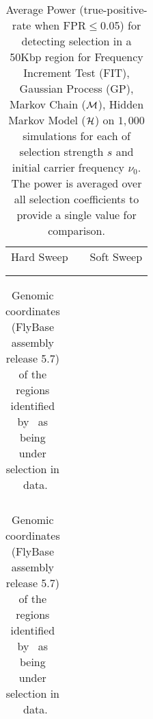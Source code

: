 \begin{table}[h]
	\centering
	\begin{tabular}{ccc}
		Hard Sweep & &Soft Sweep\\ \\  
		
		&&
	\end{tabular}
        \caption{Average Power (true-positive-rate when FPR$\le$0.05) for detecting selection in a 50Kbp region for Frequency Increment 
        Test (FIT), Gaussian Process (GP), Markov Chain (${\cal M}$), Hidden Markov 
        Model (${\cal H}$) on $1,000$ simulations for each of selection strength $s$ 
        and initial carrier frequency $\nu_0$. The power is averaged over all 
        selection coefficients to provide a single value for comparison.}
\label{tab:power}
\end{table}


\begin{table}[h]
	\centering
	\begin{tabular}{c}
		
	\end{tabular}
	\caption{Genomic coordinates (FlyBase assembly release 5.7) of the regions identified by \comale\ as being under selection in \data\ data.}\label{tab:intervals}
\end{table}

\begin{table}[h]
	\centering
	\begin{tabular}{c}
		
	\end{tabular}
	\caption{Genomic coordinates (FlyBase assembly release 5.7) of the regions 
	identified by \comale\ as being under selection in \data\ 
	data.}\label{tab:times}
\end{table}